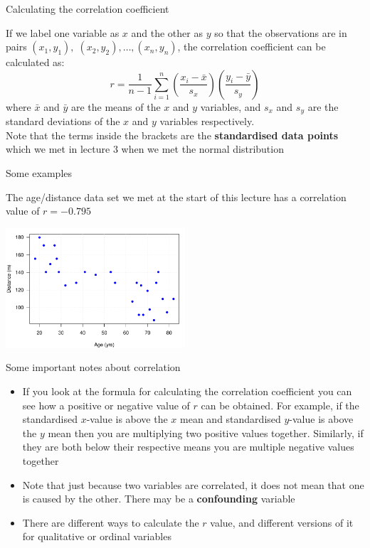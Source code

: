 \documentclass[12pt,xcolor=dvipsnames,handout,mathserif,aspectratio=169]{beamer}
\newcommand{\bre}[1]{{\color{red} \textbf{#1}}}
\newcommand{\bgr}[1]{{\color{PineGreen} \textbf{#1}}}
\begin{document}
\begin{frame}{Calculating the correlation coefficient}

If we label one variable as $x$ and the other as $y$ so that the observations are in pairs $(x_{1},y_{1}),\; (x_{2},y_{2}),\ldots, (x_{n},y_{n})$, the correlation coefficient can be calculated as:
$$r = \frac{1}{n-1} \sum_{i=1}^{n} \left( \frac{x_{i}-\bar{x}}{s_{x}} \right) \left( \frac{y_{i}-\bar{y}}{s_{y}} \right)$$
where $\bar{x}$ and $\bar{y}$ are the means of the $x$ and $y$ variables, and $s_x$ and $s_{y}$ are the standard deviations of the $x$ and $y$ variables respectively.\\
\pause
\vspace{0.2cm}
Note that the terms inside the brackets are the \bgr{standardised data points} which we met in lecture 3 when we met the normal distribution

\end{frame}

\begin{frame}{Some examples}

The age/distance data set we met at the start of this lecture has a correlation value of $r=-0.795$
\begin{center}
\includegraphics[width=0.5\textwidth]{agedist.pdf}
\end{center}
\end{frame}

\begin{frame}{Some important notes about correlation}

\begin{itemize}
\item If you look at the formula for calculating the correlation coefficient you can see how a positive or negative value of $r$ can be obtained. For example, if the standardised $x$-value is above the $x$ mean and standardised $y$-value is above the $y$ mean then you are multiplying two positive values together. Similarly, if they are both below their respective means you are multiple negative values together
\pause
\item Note that just because two variables are correlated, it does not mean that one is caused by the other. There may be a \bre{confounding} variable
\pause
\item There are different ways to calculate the $r$ value, and different versions of it for qualitative or ordinal variables
\end{itemize}

\end{frame}
\end{document}
